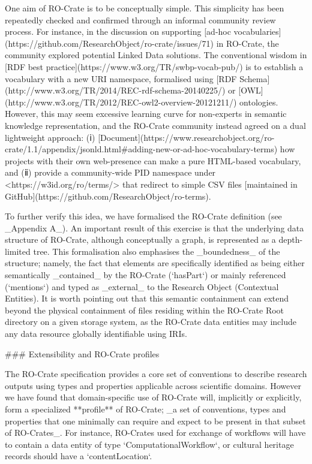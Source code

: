 {{One aim of RO-Crate is to be conceptually simple. This simplicity has been repeatedly checked and confirmed through an informal community review process. For instance, in the discussion on supporting [ad-hoc vocabularies](https://github.com/ResearchObject/ro-crate/issues/71) in RO-Crate, the community explored potential Linked Data solutions. The conventional wisdom in [RDF best practice](https://www.w3.org/TR/swbp-vocab-pub/) is to establish a vocabulary with a new URI namespace, formalised using [RDF Schema](http://www.w3.org/TR/2014/REC-rdf-schema-20140225/) or [OWL](http://www.w3.org/TR/2012/REC-owl2-overview-20121211/) ontologies.
However, this may seem excessive learning curve for non-experts in semantic knowledge representation, and the RO-Crate community instead agreed on a dual lightweight approach: (ⅰ) [Document](https://www.researchobject.org/ro-crate/1.1/appendix/jsonld.html#adding-new-or-ad-hoc-vocabulary-terms) how projects with their own web-presence can make a pure HTML-based vocabulary, and (ⅱ) provide a community-wide PID namespace under <https://w3id.org/ro/terms/> that redirect to simple CSV files [maintained in GitHub](https://github.com/ResearchObject/ro-terms). 

To further verify this idea, we have formalised the RO-Crate definition (see _Appendix A_). An important result of this exercise is that the underlying data structure of RO-Crate, although conceptually a graph, is represented as a depth-limited tree. This formalisation also emphasises the _boundedness_ of the structure; namely, the fact that elements are specifically identified as being either semantically _contained_ by the RO-Crate (`hasPart`) or mainly referenced (`mentions`) and typed as _external_ to the Research Object (Contextual Entities).  It is worth pointing out that this semantic containment can extend beyond the physical containment of files residing within the RO-Crate Root directory on a given storage system, as the RO-Crate data entities may include any data resource globally identifiable using IRIs.

### Extensibility and RO-Crate profiles

The RO-Crate specification provides a core set of conventions to describe research outputs using types and properties applicable across scientific domains. However we have found that domain-specific use of RO-Crate will, implicitly or explicitly, form a specialized **profile** of RO-Crate; _a set of conventions, types and properties that one minimally can require and expect to be present in that subset of RO-Crates_. For instance, RO-Crates used for exchange of workflows will have to contain a data entity of type `ComputationalWorkflow`, or cultural heritage records should have a `contentLocation`. 

}}
